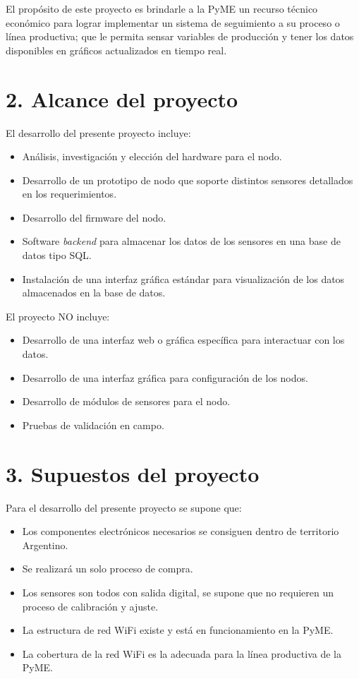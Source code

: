 \documentclass[11pt]{charter}
\begin{document}
El propósito de este proyecto es brindarle a la PyME un recurso técnico económico para lograr implementar un sistema de seguimiento a su proceso o línea productiva; que le permita sensar variables de producción y tener los datos disponibles en gráficos actualizados en tiempo real.

\section{2. Alcance del proyecto}
\label{sec:alcance}

El desarrollo del presente proyecto incluye:
\begin{itemize}
\item Análisis, investigación y elección del hardware para el nodo.
\item Desarrollo de un prototipo de nodo que soporte distintos sensores detallados en los requerimientos.
\item Desarrollo del firmware del nodo.
\item Software \textit{backend} para almacenar los datos de los sensores en una base de datos tipo SQL.
\item Instalación de una interfaz gráfica estándar para visualización de los datos almacenados en la base de datos.
\end{itemize}

El proyecto NO incluye:
\begin{itemize}
\item Desarrollo de una interfaz web o gráfica específica para interactuar con los datos.
\item Desarrollo de una interfaz gráfica para configuración de los nodos.
\item Desarrollo de módulos de sensores para el nodo.
\item Pruebas de validación en campo.
\end{itemize}


\section{3. Supuestos del proyecto}
\label{sec:supuestos}

Para el desarrollo del presente proyecto se supone que:

\begin{itemize}
\item Los componentes electrónicos necesarios se consiguen dentro de territorio Argentino.
\item Se realizará un solo proceso de compra.
\item Los sensores son todos con salida digital, se supone que no requieren un proceso de calibración y ajuste.
\item La estructura de red WiFi existe y está en funcionamiento en la PyME.
\item La cobertura de la red WiFi es la adecuada para la línea productiva de la PyME.
\end{itemize}
\end{document}
